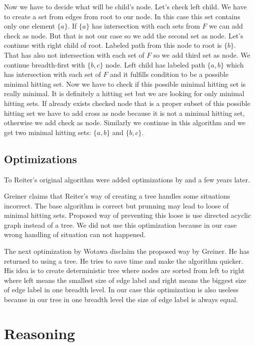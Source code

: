 \documentclass[12pt,a4paper]{article}
\begin{document}
Now we have to decide what will be child's node. Let's check left child. We have to create a set from edges from root to our node. In this case this set contains only one element $\{a\}$. If $\{a\}$ has intersection with each sets from $F$ we can add check as node. But that is not our case so we add the second set as node. Let's continue with right child of root. Labeled path from this node to root is $\{b\}$. That has also not intersection with each set of $F$ so we add third set as node. We continue breadth-first with $\{b,c\}$ node. Left child has labeled path $\{a,b\}$ which has intersection with each set of $F$ and it fulfills condition to be a possible minimal hitting set. Now we have to check if this possible minimal hitting set is really minimal. It is definitely a hitting set but we are looking for only minimal hitting sets. If already exists checked node that is a proper subset of this possible hitting set we have to add cross as node because it is not a minimal hitting set, otherwise we add check as node. Similarly we continue in this algorithm and we get two minimal hitting sets: $\{a,b\}$ and $\{b,c\}$.

\subsection{Optimizations}
To Reiter's original algorithm were added optimizations by \citep{greinerReitersCorrection} and \citep{wotawaReitersVariant} a few years later. 

Greiner claims that Reiter's way of creating a tree handles some situations incorrect. The base algorithm is correct but prunning may lead to loose of minimal hitting sets. Proposed way of preventing this loose is use directed acyclic graph instead of a tree. We did not use this optimization because in our case wrong handling of situation can not happened.

The next optimization by Wotawa disclaim the proposed way by Greiner. He has returned to using a tree. He tries to save time and make the algorithm quicker. His idea is to create deterministic tree where nodes are sorted from left to right where left means the smallest size of edge label and right means the biggest size of edge label in one breadth level. In our case this optimization is also useless because in our tree in one breadth level the size of edge label is always equal.

\section{Reasoning}
\end{document}
